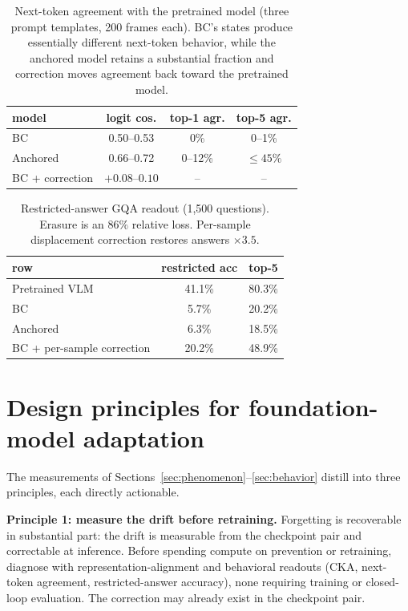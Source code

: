 \documentclass{article}
\begin{document}
\begin{table}[t]
	\centering
	\caption{Next-token agreement with the pretrained model (three prompt templates,
	200 frames each). BC's states produce essentially different next-token behavior,
	while the anchored model retains a substantial fraction and correction moves agreement back
	toward the pretrained model.}
	\label{tab:agreement}
	\begin{tabular}{lccc}
		\toprule
		model & logit cos. & top-1 agr. & top-5 agr. \\
		\midrule
		BC            & 0.50--0.53 & 0\%  & 0--1\% \\
		Anchored      & 0.66--0.72 & 0--12\% & $\le 45\%$ \\
		BC + correction & $+0.08$--$0.10$ & -- & -- \\
		\bottomrule
	\end{tabular}
\end{table}

\begin{table}[t]
	\centering
	\caption{Restricted-answer GQA readout (1{,}500 questions). Erasure is an $86\%$ relative
	loss. Per-sample displacement correction restores answers $\times 3.5$.}
	\label{tab:gqa}
	\begin{tabular}{lcc}
		\toprule
		row & restricted acc & top-5 \\
		\midrule
		Pretrained VLM      & 41.1\% & 80.3\% \\
		BC                  & 5.7\%  & 20.2\% \\
		Anchored            & 6.3\%  & 18.5\% \\
		BC + per-sample correction & 20.2\% & 48.9\% \\
		\bottomrule
	\end{tabular}
\end{table}

\section{Design principles for foundation-model adaptation}
\label{sec:principles}

The measurements of Sections~\ref{sec:phenomenon}--\ref{sec:behavior} distill into three
principles, each directly actionable.

\textbf{Principle 1: measure the drift before retraining.} Forgetting is recoverable in
substantial part: the
drift is measurable from the checkpoint pair and correctable at inference. Before spending
compute on prevention or retraining, diagnose with representation-alignment and behavioral
readouts (CKA, next-token agreement, restricted-answer accuracy), none requiring
training or closed-loop evaluation. The correction may already exist in the checkpoint pair.
\end{document}
